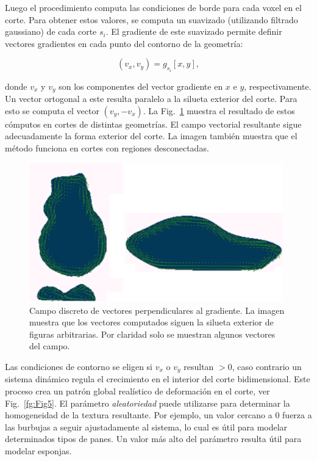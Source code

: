 Luego el procedimiento computa las condiciones de borde para cada voxel en el corte.
Para obtener estos valores, se computa un suavizado (utilizando filtrado gaussiano) de cada corte $s_{i}$.
El gradiente de este suavizado permite definir vectores gradientes en cada punto del contorno de la geometría:

$$\displaystyle (v_{x},v_{y}) = g_{s_{i}}[x,y],$$

\noindent donde $v_{x}$ y $v_{y}$ son los componentes del vector gradiente en $x$ e $y$, respectivamente.
Un vector ortogonal a este resulta paralelo a la silueta exterior del corte.
Para esto se computa el vector $(v_{y},-v_{x})$.
La Fig.~\ref{fg:Fig4} muestra el resultado de estos cómputos en cortes de distintas geometrías.
El campo vectorial resultante sigue adecuadamente la forma exterior del corte.
La imagen también muestra que el método funciona en cortes con regiones desconectadas.


\begin{figure}
  \centerline{\includegraphics[width=11cm]{figures/Fig4}}
  \caption{Campo discreto de vectores perpendiculares al gradiente. La imagen muestra que los vectores computados siguen la silueta exterior de figuras arbitrarias. Por claridad solo se muestran algunos vectores del campo.}
  \label{fg:Fig4}
\end{figure}

Las condiciones de contorno se eligen si $v_{x}$ o $v_{y}$ resultan $>0$, caso contrario un sistema dinámico regula el crecimiento en el interior del corte bidimensional.
Este proceso crea un patrón global realístico de deformación en el corte, ver Fig.~\ref{fg:Fig5}.
El parámetro {\em aleatoriedad} puede utilizarse para determinar la homogeneidad de la textura resultante.
Por ejemplo, un valor cercano a 0 fuerza a las burbujas a seguir ajustadamente al sistema, lo cual es útil para modelar determinados tipos de panes.
Un valor más alto del parámetro resulta útil para modelar esponjas.

